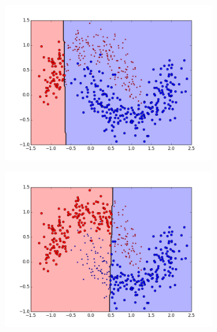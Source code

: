 \begin{figure}[t!] %
\begin{subfigure}{0.48\textwidth}
\includegraphics[width=\linewidth]{figs/Banana/2All-Classifiers}
\caption{} \label{fig:Banana_all_single_a}
\end{subfigure}\hspace*{\fill}
\begin{subfigure}{0.48\textwidth}
\includegraphics[width=\linewidth]{figs/Banana/12All-Classifiers}
\caption{} \label{fig:Banana_all_single_b}
\end{subfigure}


\end{figure}
